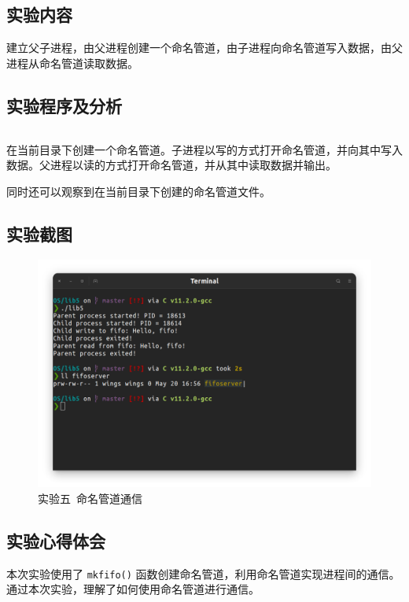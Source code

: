 \documentclass{article}
\begin{document}
		\subsection{实验内容}
			建立父子进程，由父进程创建一个命名管道，由子进程向命名管道写入数据，由父进程从命名管道读取数据。

		\subsection{实验程序及分析}
			\inputminted[linenos,breaklines,tabsize=4]{c}{lib5/lib5.c}

			在当前目录下创建一个命名管道。子进程以写的方式打开命名管道，并向其中写入数据。父进程以读的方式打开命名管道，并从其中读取数据并输出。

			同时还可以观察到在当前目录下创建的命名管道文件。

			\newpage

		\subsection{实验截图}
			\begin{figure}[htbp]
				\centering
				\includegraphics[width=\textwidth]{lib5/Screenshot.png}
				\caption{实验五\ 命名管道通信}
			\end{figure}

		\subsection{实验心得体会}
			本次实验使用了 \texttt{mkfifo()} 函数创建命名管道，利用命名管道实现进程间的通信。通过本次实验，理解了如何使用命名管道进行通信。
\end{document}
